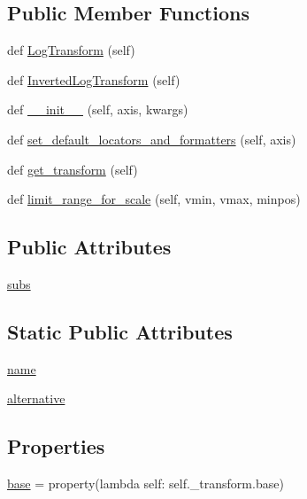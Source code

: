 \subsection*{Public Member Functions}
\begin{DoxyCompactItemize}
\item 
def \hyperlink{classmatplotlib_1_1scale_1_1LogScale_a5994bbe37b47db237e3518eab9f396bb}{Log\+Transform} (self)
\item 
def \hyperlink{classmatplotlib_1_1scale_1_1LogScale_a18b84bbc3e4693ac3264c0e6a80d27cb}{Inverted\+Log\+Transform} (self)
\item 
def \hyperlink{classmatplotlib_1_1scale_1_1LogScale_a002cc58f3b849415280acc91715748e8}{\+\_\+\+\_\+init\+\_\+\+\_\+} (self, axis, kwargs)
\item 
def \hyperlink{classmatplotlib_1_1scale_1_1LogScale_afc05cda9c038f9ac57985d9904b5844c}{set\+\_\+default\+\_\+locators\+\_\+and\+\_\+formatters} (self, axis)
\item 
def \hyperlink{classmatplotlib_1_1scale_1_1LogScale_ad2c46e6c35a5f95d07d3beaa767767b2}{get\+\_\+transform} (self)
\item 
def \hyperlink{classmatplotlib_1_1scale_1_1LogScale_a404bb8d2c35a58536ef53bc5c271e5be}{limit\+\_\+range\+\_\+for\+\_\+scale} (self, vmin, vmax, minpos)
\end{DoxyCompactItemize}
\subsection*{Public Attributes}
\begin{DoxyCompactItemize}
\item 
\hyperlink{classmatplotlib_1_1scale_1_1LogScale_acda0fd8f8118b1168b2729d21031e5d5}{subs}
\end{DoxyCompactItemize}
\subsection*{Static Public Attributes}
\begin{DoxyCompactItemize}
\item 
\hyperlink{classmatplotlib_1_1scale_1_1LogScale_ae93d03020c9ebc4e8d3e48c76462f26f}{name}
\item 
\hyperlink{classmatplotlib_1_1scale_1_1LogScale_a2b20df1e27110220677bd06798ea875b}{alternative}
\end{DoxyCompactItemize}
\subsection*{Properties}
\begin{DoxyCompactItemize}
\item 
\hyperlink{classmatplotlib_1_1scale_1_1LogScale_a9aaf08f762a334b88c0d03ae90cc92f6}{base} = property(lambda self\+: self.\+\_\+transform.\+base)
\end{DoxyCompactItemize}


